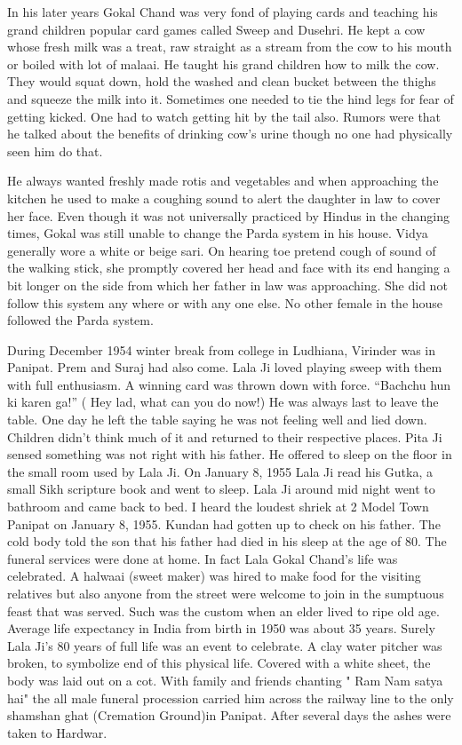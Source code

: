 In his later years Gokal Chand was very fond of playing cards and teaching his grand children popular card games called Sweep and Dusehri. He kept a cow whose fresh milk was a treat, raw straight as a stream from the cow to his mouth or boiled with lot of malaai. He taught his grand children how to milk the cow. They would squat down, hold the washed and clean bucket between the thighs and squeeze the milk into it. Sometimes one needed to tie the hind legs for fear of getting kicked. One had to watch getting hit by the tail also.  Rumors were that he talked about the benefits of drinking cow's urine though no one had physically seen him do that.

He always wanted freshly made rotis and vegetables and when approaching the kitchen he used to make a coughing sound to alert the daughter in law to cover her face. Even though it was not universally practiced by Hindus in the changing times, Gokal was still unable to change the Parda system in his house. Vidya generally wore a white or beige sari. On hearing toe pretend cough of sound of the walking stick, she promptly covered her head and face with its end hanging a bit longer on the side from which her father in law was approaching. She did not follow this system any where or with any one else. No other female in the house followed the Parda system. 

 During December 1954 winter break from college in Ludhiana, Virinder was in Panipat. Prem and Suraj had also come. Lala Ji loved playing sweep with them with full enthusiasm. A winning card was thrown down with force. “Bachchu hun ki karen ga!” ( Hey lad, what can you do now!) He was always last to leave the table. One day he left the table saying he was not feeling well and lied down. Children didn’t think much of it and returned to their respective places. Pita Ji sensed something was not right with his father. He offered to sleep on the floor in the small room used by Lala Ji. On January 8, 1955 Lala Ji read his Gutka, a small Sikh scripture book and went to sleep. Lala Ji around mid night went to bathroom and came back to bed. I heard the loudest shriek at 2 Model Town Panipat on January 8, 1955. Kundan had gotten up to check on his father. The cold body told the son that his father had died in his sleep at the age of 80. The funeral services were done at home. In fact Lala Gokal Chand's life was celebrated. A halwaai (sweet maker) was hired to make food for the visiting relatives but also anyone from the street were welcome to join in the sumptuous feast that was served. Such was the custom when an elder lived to ripe old age. Average life expectancy in India from birth in 1950 was about 35 years. Surely Lala Ji’s 80 years of full life was an event to celebrate. A clay water pitcher was broken, to symbolize end of this physical life. Covered with a white sheet, the body was laid out on a cot. With family and friends chanting " Ram Nam satya hai" the all male funeral procession carried him across the railway line to the only shamshan ghat (Cremation Ground)in Panipat. After several days the ashes were taken to Hardwar. 

